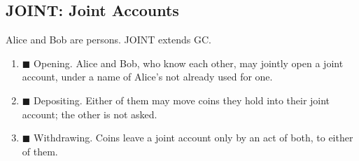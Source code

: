 \subsection*{JOINT: Joint Accounts}
\begin{contractbox}
Alice and Bob are persons.  JOINT extends GC.\par\smallskip
\begin{enumerate}[leftmargin=*]
\item $\blacksquare$ Opening.  Alice and Bob, who know each other, may jointly open a joint account, under a name of Alice's not already used for one.
\item $\blacksquare$ Depositing.  Either of them may move coins they hold into their joint account; the other is not asked.
\item $\blacksquare$ Withdrawing.  Coins leave a joint account only by an act of both, to either of them.
\end{enumerate}
\end{contractbox}
